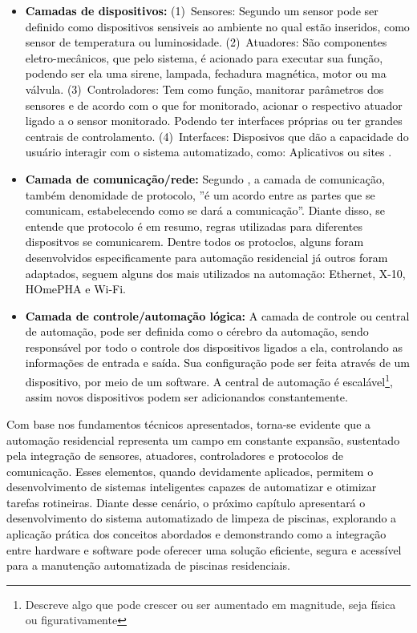             \begin{itemize}
                \item \textbf{\textcolor{black}{Camadas de dispositivos:}} \textcolor{black}{(1)~Sensores: Segundo \cite{hipolito2018automaccao} um sensor pode ser definido como dispositivos sensiveis ao ambiente no qual estão inseridos, como sensor de temperatura ou luminosidade. (2)~Atuadores: São componentes eletro-mecânicos, que pelo sistema, é acionado para executar sua função, podendo ser ela uma sirene, lampada, fechadura magnética, motor ou ma válvula. (3)~Controladores: Tem como função, manitorar parâmetros dos sensores e de acordo com o que for monitorado, acionar o respectivo atuador ligado a o sensor monitorado. Podendo ter interfaces próprias ou ter grandes centrais de controlamento. (4)~Interfaces: Disposivos que dão a capacidade do usuário interagir com o sistema automatizado, como: Aplicativos ou sites \cite{accardi2012automaccao}.}
                
                \item \textbf{\textcolor{black}{Camada de comunicação/rede:}} \textcolor{black}{Segundo \cite{accardi2012automaccao}, a camada de comunicação, também denomidade de protocolo, ''é um acordo entre as partes que se comunicam, estabelecendo como se dará a comunicação''. Diante disso, se entende que protocolo é em resumo, regras utilizadas para diferentes dispositvos se comunicarem. Dentre todos os protoclos, alguns foram desenvolvidos especificamente para automação residencial já outros foram adaptados, seguem alguns dos mais utilizados na automação: Ethernet, X-10, HOmePHA e Wi-Fi.}
                
                \item \textbf{\textcolor{black}{Camada de controle/automação lógica:}} \textcolor{black}{A camada de controle ou central de automação, pode ser definida como o cérebro da automação, sendo responsável por todo o controle dos dispositivos ligados a ela, controlando as informações de entrada e saída. Sua configuração pode ser feita através de um dispositivo, por meio de um software. A central de automação é escalável\footnote{Descreve algo que pode crescer ou ser aumentado em magnitude, seja física ou figurativamente}, assim novos dispositivos podem ser adicionandos constantemente.}
        
            \end{itemize}
    
    \textcolor{black}{Com base nos fundamentos técnicos apresentados, torna-se evidente que a automação residencial representa um campo em constante expansão, sustentado pela integração de sensores, atuadores, controladores e protocolos de comunicação. Esses elementos, quando devidamente aplicados, permitem o desenvolvimento de sistemas inteligentes capazes de automatizar e otimizar tarefas rotineiras. Diante desse cenário, o próximo capítulo apresentará o desenvolvimento do sistema automatizado de limpeza de piscinas, explorando a aplicação prática dos conceitos abordados e demonstrando como a integração entre hardware e software pode oferecer uma solução eficiente, segura e acessível para a manutenção automatizada de piscinas residenciais.}

